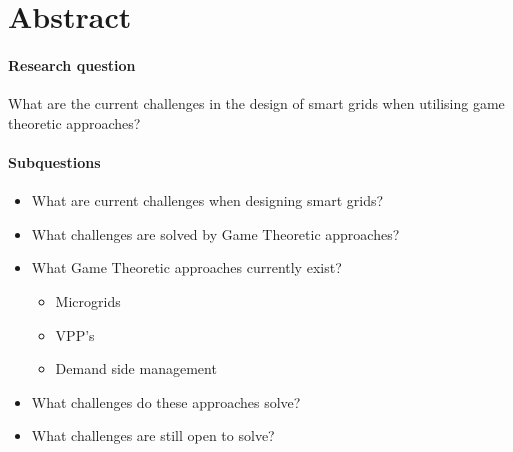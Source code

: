 \section{Abstract}

\paragraph{Research question}What are the current challenges in the design of smart grids when utilising game theoretic approaches?

\paragraph{Subquestions}
\begin{itemize}
	\item What are current challenges when designing smart grids?
	\item What challenges are solved by Game Theoretic approaches?
	\item What Game Theoretic approaches currently exist?
	\begin{itemize}
		\item Microgrids
		\item VPP’s
		\item Demand side management
	\end{itemize}
	\item What challenges do these approaches solve?
	\item What challenges are still open to solve?
\end{itemize}